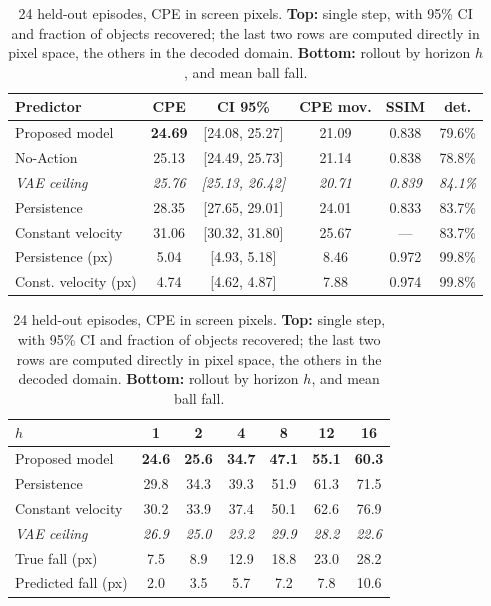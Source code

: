 \documentclass[conference]{IEEEtran}
\begin{document}
\begin{table}[!t]
\caption{24 held-out episodes, CPE in screen pixels. \textbf{Top:} single step, with 95\% CI and fraction of objects recovered; the last two rows are computed directly in pixel space, the others in the decoded domain. \textbf{Bottom:} rollout by horizon $h$, and mean ball fall.}
\label{tab:one_step}
\centering
\scriptsize
\begin{tabular}{lccccc}
\hline
\textbf{Predictor} & \textbf{CPE} & \textbf{CI 95\%} & \textbf{CPE mov.} & \textbf{SSIM} & \textbf{det.} \\
\hline
Proposed model      & \textbf{24.69} & [24.08, 25.27] & 21.09 & 0.838 & 79.6\% \\
No-Action           & 25.13 & [24.49, 25.73] & 21.14 & 0.838 & 78.8\% \\
\textit{VAE ceiling}& \textit{25.76} & \textit{[25.13, 26.42]} & \textit{20.71} & \textit{0.839} & \textit{84.1\%} \\
Persistence         & 28.35 & [27.65, 29.01] & 24.01 & 0.833 & 83.7\% \\
Constant velocity   & 31.06 & [30.32, 31.80] & 25.67 & --- & 83.7\% \\
\hline
Persistence (px)    & 5.04 & [4.93, 5.18] & 8.46 & 0.972 & 99.8\% \\
Const. velocity (px)& 4.74 & [4.62, 4.87] & 7.88 & 0.974 & 99.8\% \\
\hline
\end{tabular}

\vspace{3pt}

\begin{tabular}{lcccccc}
\hline
$h$ & 1 & 2 & 4 & 8 & 12 & 16 \\
\hline
Proposed model      & \textbf{24.6} & \textbf{25.6} & \textbf{34.7} & \textbf{47.1} & \textbf{55.1} & \textbf{60.3} \\
Persistence         & 29.8 & 34.3 & 39.3 & 51.9 & 61.3 & 71.5 \\
Constant velocity   & 30.2 & 33.9 & 37.4 & 50.1 & 62.6 & 76.9 \\
\textit{VAE ceiling}& \textit{26.9} & \textit{25.0} & \textit{23.2} & \textit{29.9} & \textit{28.2} & \textit{22.6} \\
\hline
True fall (px)      & 7.5 & 8.9 & 12.9 & 18.8 & 23.0 & 28.2 \\
Predicted fall (px) & 2.0 & 3.5 & 5.7 & 7.2 & 7.8 & 10.6 \\
\hline
\end{tabular}
\end{table}
\end{document}
